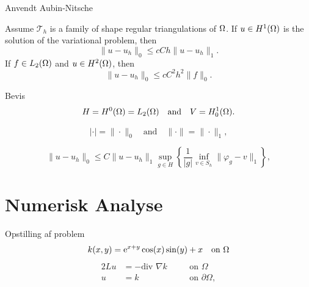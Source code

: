 \begin{frame}{Anvendt Aubin-Nitsche}
    \begin{theorem}
   Assume $\mathcal{T}_h$ is a family of shape regular triangulations of $\Omega$.
   If $u\in H^1(\Omega)$ is the solution of the variational problem, then 
   \begin{equation*}
    \|u-u_h\|_0 \leq cCh \|u-u_h\|_1.
   \end{equation*}
   If $f\in L_2(\Omega)$ and $u\in H^2(\Omega)$, then 
   \begin{equation*}
    \|u-u_h\|_0 \leq cC^2h^2 \|f\|_0.
   \end{equation*}
    \end{theorem}
\end{frame}
\begin{frame}{Bevis}
    \begin{equation*}
        H = H^0(\Omega)=L_2(\Omega) \quad \text{and} \quad V = H^1_0(\Omega).
    \end{equation*}

    \begin{equation*}
        |\cdot| = \|\cdot\|_0 \quad \text{and} \quad \|\cdot\| = \|\cdot\|_1,
    \end{equation*}

    \begin{equation*}
        \|u-u_h\|_0 \leq C \|u-u_h\|_1 \sup_{g\in H} \left \{ \frac{1}{|g|} \inf_{v \in S_h} \|\varphi_g - v\|_1 \right \},
    \end{equation*}
\end{frame}

\section{Numerisk Analyse}
\begin{frame}{Opstilling af problem}
\begin{equation*}
    k(x,y) = \text{e}^{x+y}\cos(x)\sin(y)+x  \quad\text{on }\Omega
\end{equation*}
\begin{alignat*}{2}
    Lu &= -\text{div }\nabla k \quad && \text{on } \Omega \\
    u &= k \quad && \text{on } \partial \Omega,
\end{alignat*}
\end{frame}

